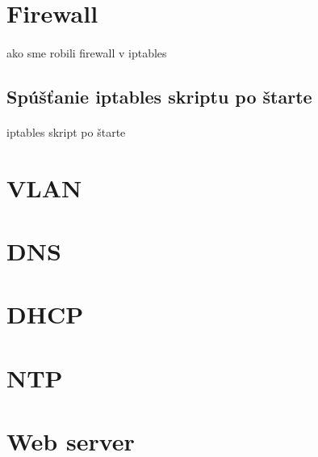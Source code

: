 \section{Firewall}
\paragraph{}
ako sme robili firewall v iptables

\subsection{Spúšťanie iptables skriptu po štarte}
\paragraph{}
iptables skript po štarte

\section{VLAN}
\paragraph{}

\section{DNS}
\paragraph{}

\section{DHCP}
\paragraph{}

\section{NTP}
\paragraph{}

\section{Web server}
